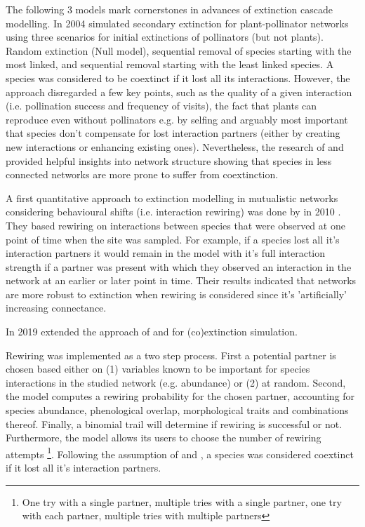 \documentclass[12pt,a4paper]{article}
\begin{document}
The following 3 models mark cornerstones in advances of extinction cascade modelling. In 2004 \citeauthor{Memmott2004} simulated secondary extinction for plant-pollinator networks using three scenarios for initial extinctions of pollinators (but not plants). Random extinction (Null model), sequential removal of species starting with the most linked, and sequential removal starting with the least linked species. A species was considered to be coextinct if it lost all its interactions. However, the approach disregarded a few key points, such as the quality of a given interaction (i.e. pollination success and frequency of visits), the fact that plants can reproduce even without pollinators e.g. by selfing and arguably most important that species don't compensate for lost interaction partners (either by creating new interactions or enhancing existing ones). Nevertheless, the research of \citeauthor{Dunne2002} and \citeauthor{Memmott2004} provided helpful insights into network structure showing that species in less connected networks are more prone to suffer from coextinction. \par

A first quantitative approach to extinction modelling in mutualistic networks considering behavioural shifts (i.e. interaction rewiring) was done by \citeauthor{Kaiser-Bunbury2010} in 2010 \parencite{Kaiser-Bunbury2010}. They based rewiring on interactions between species that were observed at one point of time when the site was sampled. For example, if a species lost all it's interaction partners it would remain in the model with it's full interaction strength if a partner was present with which they observed an interaction in the network at an earlier or later point in time. Their results indicated that networks are more robust to extinction when rewiring is considered since it's 'artificially' increasing connectance. \par

In 2019 \citeauthor{Vizentin-Bugoni2019} extended the approach of \citeauthor{Memmott2004} and \citeauthor{Dunne2002} \parencite{Memmott2004, Dunne2002} for (co)extinction simulation.

Rewiring was implemented as a two step process. First a potential partner is chosen based either on (1) variables known to be important for species interactions in the studied network (e.g. abundance) or (2) at random. Second, the model computes a rewiring probability for the chosen partner, accounting for species abundance, phenological overlap, morphological traits and combinations thereof. Finally, a binomial trail will determine if rewiring is successful or not. Furthermore, the model allows its users to choose the number of rewiring attempts \footnote{
One try with a single partner, 
multiple tries with a single partner, 
one try with each partner, 
multiple tries with multiple partners
}. Following the assumption of \citeauthor{Memmott2004} and \citeauthor{Dunne2002}, a species was considered coextinct if it lost all it's interaction partners.
\par
\end{document}
